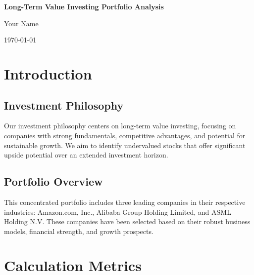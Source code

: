 \documentclass[12pt]{report}
\begin{document}
\begin{titlepage}
    \centering
    \vspace*{2cm}
    {\huge\bfseries Long-Term Value Investing Portfolio Analysis\par}
    \vspace{1.5cm}
    {\Large Your Name\par}
    \vfill
    {\large \today\par}
\end{titlepage}

\begin{abstract}
\noindent
This report presents a comprehensive analysis of a concentrated, long-term value investing portfolio comprising Amazon.com, Inc. (AMZN), Alibaba Group Holding Limited (BABA), and ASML Holding N.V. (ASML). The analysis includes an in-depth examination of each company's business model, financial performance, intrinsic valuation, and associated risks, supporting the investment thesis for each.
\end{abstract}

\tableofcontents
\newpage

\chapter{Introduction}
\section{Investment Philosophy}
Our investment philosophy centers on long-term value investing, focusing on companies with strong fundamentals, competitive advantages, and potential for sustainable growth. We aim to identify undervalued stocks that offer significant upside potential over an extended investment horizon.

\section{Portfolio Overview}
This concentrated portfolio includes three leading companies in their respective industries: Amazon.com, Inc., Alibaba Group Holding Limited, and ASML Holding N.V. These companies have been selected based on their robust business models, financial strength, and growth prospects.

\chapter{Calculation Metrics}
\end{document}
